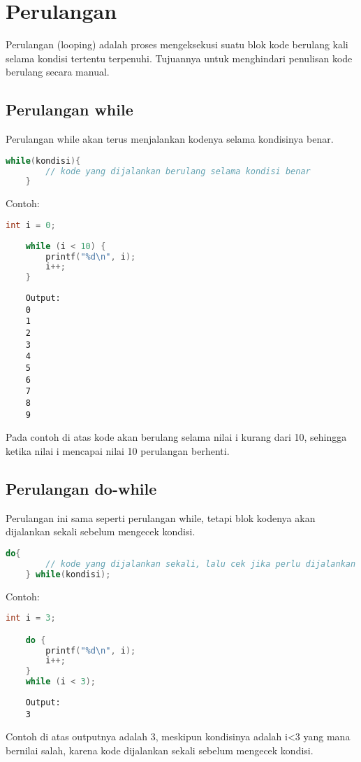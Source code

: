 \section{Perulangan}

Perulangan (looping) adalah proses mengeksekusi suatu blok kode berulang kali selama kondisi tertentu terpenuhi.
Tujuannya untuk menghindari penulisan kode berulang secara manual.

\subsection{Perulangan while}
Perulangan while akan terus menjalankan kodenya selama kondisinya benar.
{
\captionsetup[lstlisting]{labelformat=empty, justification=raggedright, singlelinecheck=false} %
\begin{lstlisting}[language=c, caption={syntax}]
	while(kondisi){
		// kode yang dijalankan berulang selama kondisi benar
	}
\end{lstlisting}
}
Contoh:
\begin{lstlisting}[language=c]
	int i = 0;
	
	while (i < 10) {
		printf("%d\n", i);
		i++;
	}
\end{lstlisting}
\begin{verbatim}
	Output:
    0
    1
    2
    3
    4
    5
    6
    7
    8
    9
\end{verbatim}
Pada contoh di atas kode akan berulang selama nilai i kurang dari 10, sehingga ketika nilai i mencapai nilai 10 perulangan berhenti.

\subsection{Perulangan do-while}

Perulangan ini sama seperti perulangan while, tetapi blok kodenya akan dijalankan sekali sebelum mengecek kondisi.
{
\captionsetup[lstlisting]{labelformat=empty, justification=raggedright, singlelinecheck=false} %
\begin{lstlisting}[language=c, caption={syntax}]
	do{
		// kode yang dijalankan sekali, lalu cek jika perlu dijalankan lagi
	} while(kondisi);
\end{lstlisting}
}
Contoh:
\begin{lstlisting}[language=c]
	int i = 3;

	do {
		printf("%d\n", i);
		i++;
	}
	while (i < 3);
\end{lstlisting}
\begin{verbatim}
	Output:
	3
\end{verbatim}
Contoh di atas outputnya adalah 3, meskipun kondisinya adalah i<3 yang mana bernilai salah, karena kode dijalankan sekali sebelum mengecek kondisi.

